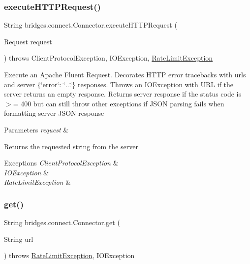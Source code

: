 \subsubsection{\texorpdfstring{execute\+H\+T\+T\+P\+Request()}{executeHTTPRequest()}}
{\footnotesize\ttfamily String bridges.\+connect.\+Connector.\+execute\+H\+T\+T\+P\+Request (\begin{DoxyParamCaption}\item[{Request}]{request }\end{DoxyParamCaption}) throws Client\+Protocol\+Exception, I\+O\+Exception, \hyperlink{classbridges_1_1validation_1_1_rate_limit_exception}{Rate\+Limit\+Exception}}

Execute an Apache Fluent Request. Decorates H\+T\+TP error tracebacks with urls and server \{\char`\"{}error\char`\"{}\+: \char`\"{}...\char`\"{}\} responses. Throws an I\+O\+Exception with U\+RL if the server returns an empty response. Returns server response if the status code is $>$= 400 but can still throw other exceptions if J\+S\+ON parsing fails when formatting server J\+S\+ON response 
\begin{DoxyParams}{Parameters}
{\em request} & \\
\hline
\end{DoxyParams}
\begin{DoxyReturn}{Returns}
the requested string from the server 
\end{DoxyReturn}

\begin{DoxyExceptions}{Exceptions}
{\em Client\+Protocol\+Exception} & \\
\hline
{\em I\+O\+Exception} & \\
\hline
{\em Rate\+Limit\+Exception} & \\
\hline
\end{DoxyExceptions}
\hypertarget{classbridges_1_1connect_1_1_connector_aec8d54bf707c50d6f8173a0c1640fcd5}{}\label{classbridges_1_1connect_1_1_connector_aec8d54bf707c50d6f8173a0c1640fcd5} 
\subsubsection{\texorpdfstring{get()}{get()}}
{\footnotesize\ttfamily String bridges.\+connect.\+Connector.\+get (\begin{DoxyParamCaption}\item[{String}]{url }\end{DoxyParamCaption}) throws \hyperlink{classbridges_1_1validation_1_1_rate_limit_exception}{Rate\+Limit\+Exception}, I\+O\+Exception}

